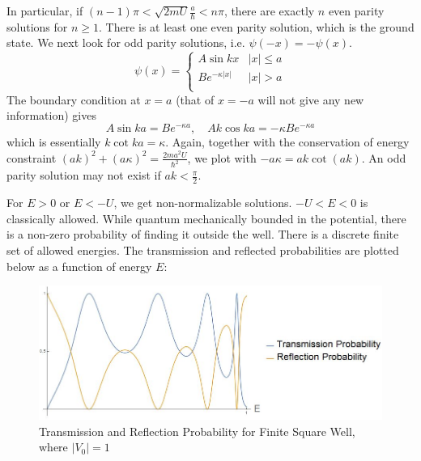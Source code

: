 \documentclass[a4paper]{article}
\begin{document}
\begin{eg}
\begin{center}
\end{center}
In particular, if $(n-1)\pi<\sqrt{2mU}\frac{a}{\hbar}<n\pi$, there are exactly $n$ even parity solutions for $n\geq1$. There is at least one even parity solution, which is the ground state. We next look for odd parity solutions, i.e. $\psi(-x)=-\psi(x)$.
   $$
\psi(x)=
\left\{
        \begin{array}{ll}
      A\sin kx & |x|\leq a \\
	Be^{-\kappa|x|}& |x|>a\\
        \end{array}
    \right.
$$
The boundary condition at $x=a$ (that of $x=-a$ will not give any new information) gives
$$A\sin ka=Be^{-\kappa a},\quad Ak\cos ka=-\kappa Be^{-\kappa a}$$
which is essentially $k\cot ka=\kappa$. Again, together with the conservation of energy constraint $(ak)^2+(a\kappa)^2=\frac{2ma^2U}{\hbar^2}$, we plot with $-a\kappa=ak \cot(ak)$. An odd parity solution may not exist if $ak<\frac{\pi}{2}$.
\begin{center}
\end{center}
For $E>0$ or $E<-U$, we get non-normalizable solutions. $-U<E<0$ is classically allowed. While quantum mechanically bounded in the potential, there is a non-zero probability of finding it outside the well. There is a discrete finite set of allowed energies. The transmission and reflected probabilities are plotted below as a function of energy $E$:
\begin{figure}[H]
\includegraphics[scale=0.5]{finitetransmission}
\centering
\caption{Transmission and Reflection Probability for Finite Square Well, where $|V_0|=1$}
\end{figure}
\end{eg}
\end{document}
